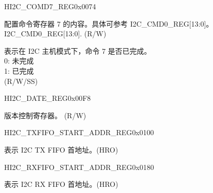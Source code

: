 \begin{register}{H}{I2C\_COMD7\_REG}{0x0074}\label{regdesc:I2CCOMD7REG}
%
%
%
\regnewline%
\begin{regdesc}\begin{reglist}
\label{fielddesc:I2CCOMMAND7}\item [I2C\_COMMAND7] 配置命令寄存器 7 的内容。具体可参考 I2C\_CMD0\_REG[13:0]。 I2C\_CMD0\_REG[13:0]. (R/W)
\label{fielddesc:I2CCOMMAND7DONE}\item [I2C\_COMMAND7\_DONE] 表示在 I2C 主机模式下，命令 7 是否已完成。\\
0: 未完成\\
1: 已完成  \\ (R/W/SS)
\end{reglist}\end{regdesc}
\end{register}


\begin{register}{H}{I2C\_DATE\_REG}{0x00F8}\label{regdesc:I2CDATEREG}
%
\regnewline%
\begin{regdesc}\begin{reglist}
\label{fielddesc:I2CDATE}\item [I2C\_DATE] 版本控制寄存器。 (R/W)
\end{reglist}\end{regdesc}
\end{register}


\begin{register}{H}{I2C\_TXFIFO\_START\_ADDR\_REG}{0x0100}\label{regdesc:I2CTXFIFOSTARTADDRREG}
%
\regnewline%
\begin{regdesc}\begin{reglist}
\label{fielddesc:I2CTXFIFOSTARTADDR}\item [I2C\_TXFIFO\_START\_ADDR] 表示 I2C TX FIFO 首地址。(HRO)
\end{reglist}\end{regdesc}
\end{register}


\begin{register}{H}{I2C\_RXFIFO\_START\_ADDR\_REG}{0x0180}\label{regdesc:I2CRXFIFOSTARTADDRREG}
%
\regnewline%
\begin{regdesc}\begin{reglist}
\label{fielddesc:I2CRXFIFOSTARTADDR}\item [I2C\_RXFIFO\_START\_ADDR] 表示 I2C RX FIFO 首地址。(HRO)
\end{reglist}\end{regdesc}
\end{register}


